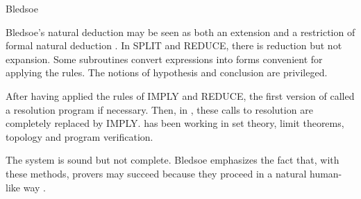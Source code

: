 \begin{entry}{Bledsoe}
\begin{clarifications}
Bledsoe's natural deduction may be seen as both an extension and 
a restriction of formal natural deduction . 
In SPLIT and REDUCE, there is reduction but not expansion. 
Some subroutines convert expressions into forms convenient 
for applying the rules. 
The notions of hypothesis and conclusion are privileged.
\end{clarifications}

\begin{history}
After having applied the rules of IMPLY and REDUCE, the first version of
{\sc \Bledsoe} \cite{bledsoe:1971} called a resolution program if necessary. 
Then, in \cite{bledsoe:1972}, these calls to resolution are completely 
replaced by IMPLY. 
\Bledsoe has been working in set theory, limit theorems, topology and 
program verification.
\end{history}

\begin{technicalities}
The system is sound but not complete.
Bledsoe emphasizes the fact that, with these methods, provers may succeed 
because they proceed in a natural human-like way
\cite{bledsoe:1977}.
\end{technicalities}


\end{entry}

